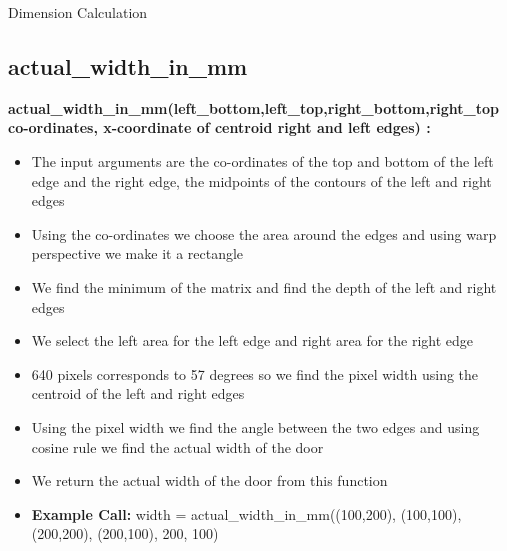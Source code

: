 \documentclass[10pt, a4paper]{beamer}
\begin{document}
\begin{frame}[allowframebreaks]{Dimension Calculation}
  \subsection{actual\_width\_in\_mm}
    \textbf{actual\_width\_in\_mm(left\_bottom,left\_top,right\_bottom,right\_top co-ordinates, x-coordinate of centroid right and left edges) : }
      \begin{itemize}
       \item The input arguments are the co-ordinates of the top and bottom of the left edge and the right edge, the midpoints of the contours of the left and right edges
       \item Using the co-ordinates we choose the area around the edges and using warp perspective we make it a rectangle
       \item We find the minimum of the matrix and find the depth of the left and right edges
       \item We select the left area for the left edge and right area for the right edge
       \item 640 pixels corresponds to 57 degrees so we find the pixel width using the centroid of the left and right edges
       \item Using the pixel width we find the angle between the two edges and using cosine rule we find the actual width of the door
       \item We return the actual width of the door from this function
       \item \textbf{Example Call:} width = actual\_width\_in\_mm((100,200), (100,100), (200,200), (200,100), 200, 100)
      \end{itemize}
  \framebreak

\end{frame}
\end{document}
